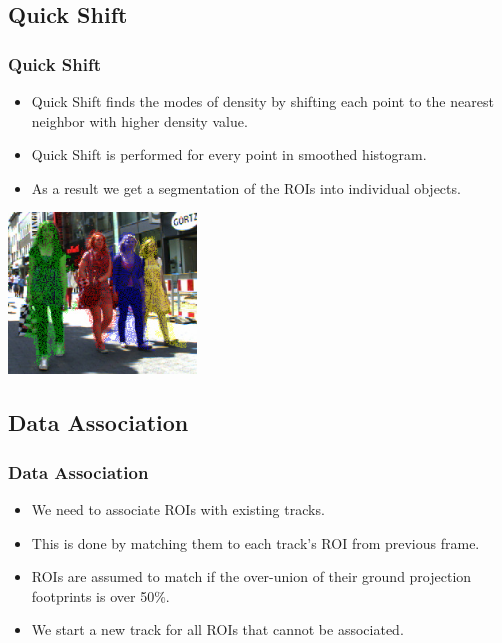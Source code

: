 \documentclass{beamer}
\begin{document}
\subsection{Quick Shift}
\begin{frame}
\frametitle{Quick Shift} 

\begin{itemize}
  \item Quick Shift finds the modes of density by shifting each point to the nearest neighbor with higher density value. 
  \item Quick Shift is performed for every point in smoothed histogram.
  \item As a result we get a segmentation of the ROIs into individual objects.
\end{itemize}
	\begin{center}
  \includegraphics[width=5cm]{image-045.jpg}
  \end{center}
\end{frame}

\subsection{Data Association}
\begin{frame}
\frametitle{Data Association} 

\begin{itemize}
  \item We need to associate ROIs with existing tracks.
  \item This is done by matching them to each track's ROI from previous frame.
  \item ROIs are assumed to match if the over-union of their ground projection footprints is over 50\%.
  \item We start a new track for all ROIs that cannot be associated.
\end{itemize}
\end{frame}
\end{document}
